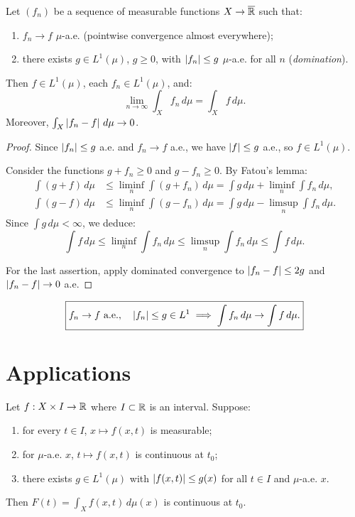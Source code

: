\begin{theorem}
\label{thm:dominated_convergence}
Let $(f_n)$ be a sequence of measurable functions $X \to \overline{\mathbb{R}}$ such that:
\begin{enumerate}
    \item[(i)] $f_n \to f$ $\mu$-a.e. (pointwise convergence almost everywhere);
    \item[(ii)] there exists $g \in L^1(\mu)$, $g \geq 0$, with
    $\left| f_n \right| \leq g$ $\mu$-a.e. for all $n$ (\emph{domination}).
\end{enumerate}
Then $f \in L^1(\mu)$, each $f_n \in L^1(\mu)$, and:
\[
\lim_{n \to \infty} \int_X f_n\, d\mu = \int_X f\, d\mu.
\]
Moreover, $\int_X \left| f_n - f \right|\, d\mu \to 0$.
\end{theorem}

\begin{proof}
Since $\left| f_n \right| \leq g$ a.e. and $f_n \to f$ a.e., we have $\left| f \right| \leq g$ a.e.,
so $f \in L^1(\mu)$.

Consider the functions $g + f_n \geq 0$ and $g - f_n \geq 0$. By Fatou's lemma:
\begin{align*}
\int (g + f)\, d\mu &\leq \liminf_n \int (g + f_n)\, d\mu
= \int g\, d\mu + \liminf_n \int f_n\, d\mu, \\
\int (g - f)\, d\mu &\leq \liminf_n \int (g - f_n)\, d\mu
= \int g\, d\mu - \limsup_n \int f_n\, d\mu.
\end{align*}
Since $\int g\, d\mu < \infty$, we deduce:
\[
\int f\, d\mu \leq \liminf_n \int f_n\, d\mu \leq
\limsup_n \int f_n\, d\mu \leq \int f\, d\mu.
\]

For the last assertion, apply dominated convergence to $\left| f_n - f \right| \leq 2g$
and $\left| f_n - f \right| \to 0$ a.e.
\end{proof}

\begin{keyformulas}[title=\textbf{Dominated convergence theorem}]
\[
\boxed{f_n \to f \text{ a.e.}, \quad \left| f_n \right| \leq g \in L^1
\implies \int f_n\, d\mu \to \int f\, d\mu.}
\]
\end{keyformulas}

\section{Applications}

\begin{corollary}
\label{cor:continuity_integral}
Let $f : X \times I \to \mathbb{R}$ where $I \subset \mathbb{R}$ is an interval. Suppose:
\begin{enumerate}
    \item for every $t \in I$, $x \mapsto f(x, t)$ is measurable;
    \item for $\mu$-a.e. $x$, $t \mapsto f(x, t)$ is continuous at $t_0$;
    \item there exists $g \in L^1(\mu)$ with $\left| f(x, t) \right| \leq g(x)$ for all
    $t \in I$ and $\mu$-a.e. $x$.
\end{enumerate}
Then $F(t) = \int_X f(x, t)\, d\mu(x)$ is continuous at $t_0$.
\end{corollary}


